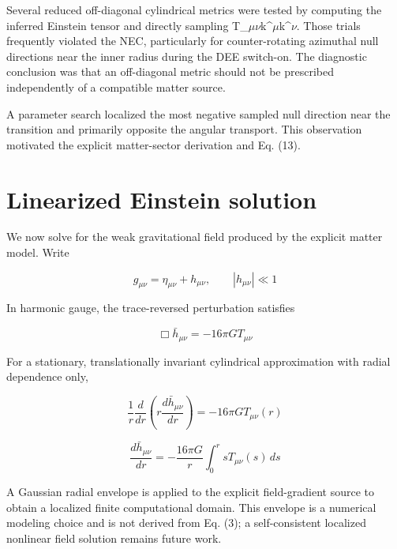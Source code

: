 \documentclass[aps,prd,preprint,nofootinbib,superscriptaddress]{revtex4-2}
\begin{document}
Several reduced off-diagonal cylindrical metrics were tested by computing the inferred Einstein tensor and directly sampling T\_$\mu$$\nu$k\textasciicircum{}$\mu$k\textasciicircum{}$\nu$. Those trials frequently violated the NEC, particularly for counter-rotating azimuthal null directions near the inner radius during the DEE switch-on. The diagnostic conclusion was that an off-diagonal metric should not be prescribed independently of a compatible matter source.


A parameter search localized the most negative sampled null direction near the transition and primarily opposite the angular transport. This observation motivated the explicit matter-sector derivation and Eq. (13).


\section{Linearized Einstein solution}

We now solve for the weak gravitational field produced by the explicit matter model. Write


\begin{equation}
g_{\mu\nu}=\eta_{\mu\nu}+h_{\mu\nu},\qquad |h_{\mu\nu}|\ll1
\tag{32}\label{eq:32}
\end{equation}

In harmonic gauge, the trace-reversed perturbation satisfies


\begin{equation}
\Box\bar h_{\mu\nu}=-16\pi G T_{\mu\nu}
\tag{33}\label{eq:33}
\end{equation}

For a stationary, translationally invariant cylindrical approximation with radial dependence only,


\begin{equation}
\frac1r\frac{d}{dr}\left(r\frac{d\bar h_{\mu\nu}}{dr}\right)=-16\pi G T_{\mu\nu}(r)
\tag{34}\label{eq:34}
\end{equation}

\begin{equation}
\frac{d\bar h_{\mu\nu}}{dr}=-\frac{16\pi G}{r}\int_0^r sT_{\mu\nu}(s)\,ds
\tag{35}\label{eq:35}
\end{equation}

A Gaussian radial envelope is applied to the explicit field-gradient source to obtain a localized finite computational domain. This envelope is a numerical modeling choice and is not derived from Eq. (3); a self-consistent localized nonlinear field solution remains future work.
\end{document}

